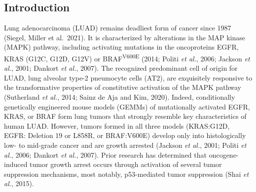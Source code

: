 \hypertarget{introduction-1}{%
\subsection{Introduction}\label{introduction-1}}

Lung adenocarcinoma (LUAD) remains deadliest form of cancer since 1987 (Siegel, Miller et al.~2021). It is characterized by alterations in the MAP kinase (MAPK) pathway, including activating mutations in the oncoproteins EGFR, KRAS (G12C, G12D, G12V) or BRAF\textsuperscript{V600E} (2014; Politi \emph{et al.}, 2006; Jackson \emph{et al.}, 2001; Dankort \emph{et al.}, 2007). The recognized predominant cell of origin for LUAD, lung alveolar type-2 pneumocyte cells (AT2), are exquisitely responsive to the transformative properties of constitutive activation of the MAPK pathway (Sutherland \emph{et al.}, 2014; Sainz de Aja and Kim, 2020). Indeed, conditionally genetically engineered mouse models (GEMMs) of mutationally activated EGFR, KRAS, or BRAF form lung tumors that strongly resemble key characteristics of human LUAD. However, tumors formed in all three models (KRAS:G12D, EGFR: Deletion 19 or L858R, or BRAF:V600E) develop only into histologically low- to mid-grade cancer and are growth arrested (Jackson \emph{et al.}, 2001; Politi \emph{et al.}, 2006; Dankort \emph{et al.}, 2007). Prior research has determined that oncogene-induced tumor growth arrest occurs through activation of several tumor suppression mechanisms, most notably, p53-mediated tumor suppression (Shai \emph{et al.}, 2015).

